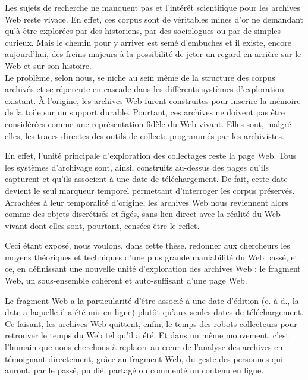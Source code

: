 \documentclass[symmetric,justified,marginals=raggedouter]{tufte-book}
\begin{document}
Les sujets de recherche ne manquent pas et l'intérêt scientifique pour les archives Web reste vivace. En effet, ces corpus sont de véritables mines d'or ne demandant qu'à être explorées par des historiens, par des sociologues ou par de simples curieux. Mais le chemin pour y arriver est semé d'embuches et il existe, encore aujourd'hui, des freins majeurs à la possibilité de jeter un regard en arrière sur le Web et sur son histoire.\\

\noindent Le problème, selon nous, se niche au sein même de la structure des corpus archivés et se répercute en cascade dans les différents systèmes d'exploration existant. À l'origine, les archives Web furent construites pour inscrire la mémoire de la toile sur un support durable. Pourtant, ces archives ne doivent pas être considérées comme une représentation fidèle du Web vivant. Elles sont, malgré elles, les traces directes des outils de collecte programmés par les archivistes. 

En effet, l'unité principale d'exploration des collectages reste la page Web. Tous les systèmes d'archivage sont, ainsi, construits au-dessus des pages qu'ils capturent et qu'ils associent à une date de téléchargement. De fait, cette date devient le seul marqueur temporel permettant d'interroger les corpus préservés. Arrachées à leur temporalité d'origine, les archives Web nous reviennent alors comme des objets discrétisés et figés, sans lien direct avec la réalité du Web vivant dont elles sont, pourtant, censées être le reflet.

Ceci étant exposé, nous voulons, dans cette thèse, redonner aux chercheurs les moyens théoriques et techniques d'une plus grande maniabilité du Web passé, et ce, en définissant une nouvelle unité d'exploration des archives Web : le fragment Web, un sous-ensemble cohérent et auto-suffisant d'une page Web. 

Le fragment Web a la particularité d'être associé à une date d'édition (c.-à-d., la date a laquelle il a été mis en ligne) plutôt qu'aux seules dates de téléchargement. Ce faisant, les archives Web quittent, enfin, le temps des robots collecteurs pour retrouver le temps du Web tel qu'il a été. Et dans un même mouvement, c'est l'humain que nous cherchons à replacer au cœur de l'analyse des archives en témoignant directement, grâce au fragment Web, du geste des personnes qui auront, par le passé, publié, partagé ou commenté un contenu en ligne.   
\end{document}

